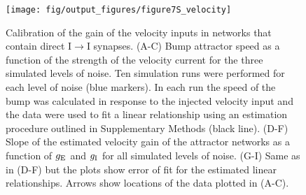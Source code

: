 \documentclass[a4paper,12pt]{article}
\newcommand{\ssc}[3]{\ensuremath{#1_{\text{#2}_{\text{#3}}}}}
\newcommand{\gE      }{\ssc{g}      {\scriptsize{E}}{}}
\newcommand{\gI      }{\ssc{g}      {\scriptsize{I}}{}}
\begin{document}
\clearpage

\begin{figure}[ht!]
    \internallinenumbers
    \centering
        \texttt{[image: fig/output\_figures/figure7S\_velocity]}
    \caption{Calibration of the gain of the velocity inputs in networks that
    contain direct I$\rightarrow$I synapses. (A-C) Bump attractor speed as a
    function of the strength of the velocity current for the three simulated
    levels of noise. Ten simulation runs were performed for each level of noise
    (blue markers). In each run the speed of the bump was calculated in
    response to the injected velocity input and the data were used to fit a
    linear relationship using an estimation procedure outlined in Supplementary
    Methods (black line). (D-F) Slope of the estimated velocity gain of the
    attractor networks as a function of $\gE$ and $\gI$ for all simulated
    levels of noise. (G-I) Same as in (D-F) but the plots show error of fit for
    the estimated linear relationships. Arrows show locations of the data
    plotted in (A-C).}
\end{figure}

\clearpage
\end{document}
